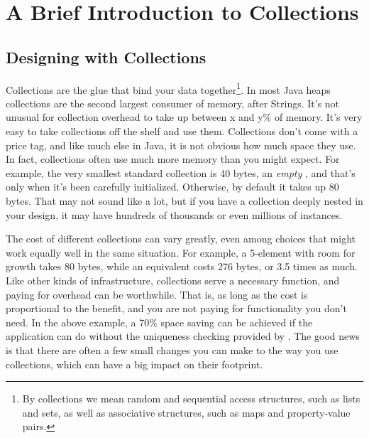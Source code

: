 \chapter{A Brief Introduction to Collections}
\label{chapter:brief-introduction-collections}

\section{Designing with Collections}
Collections are the glue that bind your data together\footnote{By
collections we mean random and sequential access structures, such as lists and
sets, as well as associative structures, such as maps and property-value pairs.}. 
In most Java heaps collections are the second largest consumer of memory,
after Strings.  It's not unusual for collection overhead to take up between
x and y\% of memory. It's very easy to take collections off the shelf
and use them. Collections don't come with a price tag, and like much else
in Java, it is not obvious how much space they use. In fact,
collections often use much more memory than you might expect. For example,
the very smallest standard collection is 40 bytes, an \emph{empty}
, and that's only when it's been carefully initialized. 
Otherwise, by default it takes up 80 bytes. That may not sound like a lot,
but if you have a collection deeply nested in your design, it may have hundreds
of thousands or even millions of instances.

The cost of different collections can vary greatly, even among choices that
might work equally well in the same situation. For example, a 5-element 
with room for growth takes 80 bytes, while an equivalent  costs 276 bytes, or 3.5 times as much. 
Like other kinds of infrastructure, collections serve a necessary
function, and paying for overhead can be worthwhile.  That is, as long as
the cost is proportional to the benefit, and you are not paying
for functionality you don't need. In the above example, a 70\% space saving
can be achieved if the application can do without the uniqueness checking
provided by .  The good news is that there are often a few small
changes you can make to the way you use collections, which can have a big
impact on their footprint.

